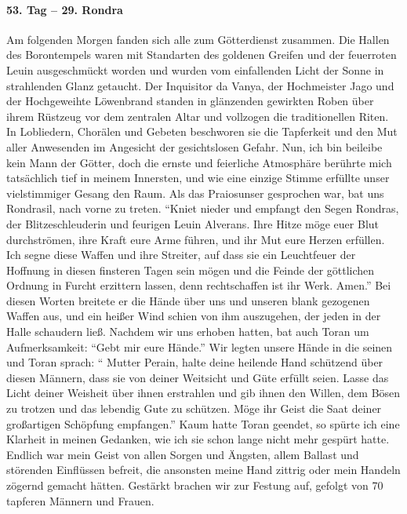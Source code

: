 \paragraph{53. Tag -- 29. Rondra}
Am folgenden Morgen fanden sich alle zum Götterdienst zusammen. Die Hallen des Borontempels waren mit Standarten des goldenen Greifen und der feuerroten Leuin ausgeschmückt worden und wurden vom einfallenden Licht der Sonne in strahlenden Glanz getaucht. Der Inquisitor da Vanya, der Hochmeister Jago und der Hochgeweihte Löwenbrand standen in glänzenden gewirkten Roben über ihrem Rüstzeug vor dem zentralen Altar und vollzogen die traditionellen Riten. In Lobliedern, Chorälen und Gebeten beschworen sie die Tapferkeit und den Mut aller Anwesenden im Angesicht der gesichtslosen Gefahr. Nun, ich bin beileibe kein Mann der Götter, doch die ernste und feierliche Atmosphäre berührte mich tatsächlich tief in meinem Innersten, und wie eine einzige Stimme erfüllte unser vielstimmiger Gesang den Raum. Als das Praiosunser gesprochen war, bat uns Rondrasil, nach vorne zu treten. ``Kniet nieder und empfangt den Segen Rondras, der Blitzeschleuderin und feurigen Leuin Alverans. Ihre Hitze möge euer Blut durchströmen, ihre Kraft eure Arme führen, und ihr Mut eure Herzen erfüllen. Ich segne diese Waffen und ihre Streiter, auf dass sie ein Leuchtfeuer der Hoffnung in diesen finsteren Tagen sein mögen und die Feinde der göttlichen Ordnung in Furcht erzittern lassen, denn rechtschaffen ist ihr Werk. Amen.'' Bei diesen Worten breitete er die Hände über uns und unseren blank gezogenen Waffen aus, und ein heißer Wind schien von ihm auszugehen, der jeden in der Halle schaudern ließ. Nachdem wir uns erhoben hatten, bat auch Toran um Aufmerksamkeit: ``Gebt mir eure Hände.'' Wir legten unsere Hände in die seinen und Toran sprach: `` Mutter Perain, halte deine heilende Hand schützend über diesen Männern, dass sie von deiner Weitsicht und Güte erfüllt seien. Lasse das Licht deiner Weisheit über ihnen erstrahlen und gib ihnen den Willen, dem Bösen zu trotzen und das lebendig Gute zu schützen. Möge ihr Geist die Saat deiner großartigen Schöpfung empfangen.'' Kaum hatte Toran geendet, so spürte ich eine Klarheit in meinen Gedanken, wie ich sie schon lange nicht mehr gespürt hatte. Endlich war mein Geist von allen Sorgen und Ängsten, allem Ballast und störenden Einflüssen befreit, die ansonsten meine Hand zittrig oder mein Handeln zögernd gemacht hätten. Gestärkt brachen wir zur Festung auf, gefolgt von 70 tapferen Männern und Frauen.


